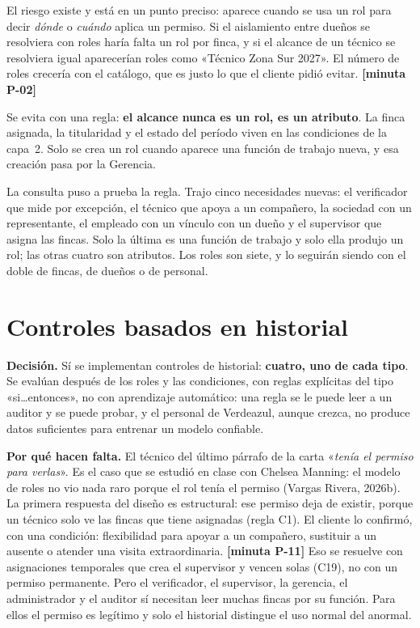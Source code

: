 \documentclass[11pt,letterpaper]{article}
\newcommand{\resp}[1]{\textrm{\footnotesize\bfseries [minuta #1]}}
\newcommand{\carta}[1]{«\emph{#1}»}
\begin{document}
El riesgo existe y está en un punto preciso: aparece cuando se usa un rol para decir \emph{dónde} o
\emph{cuándo} aplica un permiso. Si el aislamiento entre dueños se resolviera con roles haría falta un
rol por finca, y si el alcance de un técnico se resolviera igual aparecerían roles como «Técnico Zona
Sur 2027». El número de roles crecería con el catálogo, que es justo lo que el cliente pidió evitar.
\resp{P-02}

Se evita con una regla: \textbf{el alcance nunca es un rol, es un atributo}. La finca asignada, la
titularidad y el estado del período viven en las condiciones de la capa~2. Solo se crea un rol cuando
aparece una función de trabajo nueva, y esa creación pasa por la Gerencia.

La consulta puso a prueba la regla. Trajo cinco necesidades nuevas: el verificador que mide por
excepción, el técnico que apoya a un compañero, la sociedad con un representante, el empleado con un
vínculo con un dueño y el supervisor que asigna las fincas. Solo la última es una función de trabajo
y solo ella produjo un rol; las otras cuatro son atributos. Los roles son siete, y lo seguirán siendo
con el doble de fincas, de dueños o de personal.

\section{Controles basados en historial}
\label{sec:hbac}

\begin{decision}
\textbf{Decisión.} Sí se implementan controles de historial: \textbf{cuatro, uno de cada tipo}. Se
evalúan después de los roles y las condiciones, con reglas explícitas del tipo «si\ldots entonces», no
con aprendizaje automático: una regla se le puede leer a un auditor y se puede probar, y el personal
de Verdeazul, aunque crezca, no produce datos suficientes para entrenar un modelo confiable.
\end{decision}

\textbf{Por qué hacen falta.} El técnico del último párrafo de la carta \carta{tenía el permiso para
verlas}. Es el caso que se estudió en clase con Chelsea Manning: el modelo de roles no vio nada raro
porque el rol tenía el permiso (Vargas Rivera, 2026b). La primera respuesta del diseño es estructural:
ese permiso deja de existir, porque un técnico solo ve las fincas que tiene asignadas (regla C1). El
cliente lo confirmó, con una condición: flexibilidad para apoyar a un compañero, sustituir a un
ausente o atender una visita extraordinaria. \resp{P-11} Eso se resuelve con asignaciones temporales
que crea el supervisor y vencen solas (C19), no con un permiso permanente. Pero el verificador, el
supervisor, la gerencia, el administrador y el auditor sí necesitan leer muchas fincas por su
función. Para ellos el permiso es legítimo y solo el historial distingue el uso normal del anormal.
\end{document}
